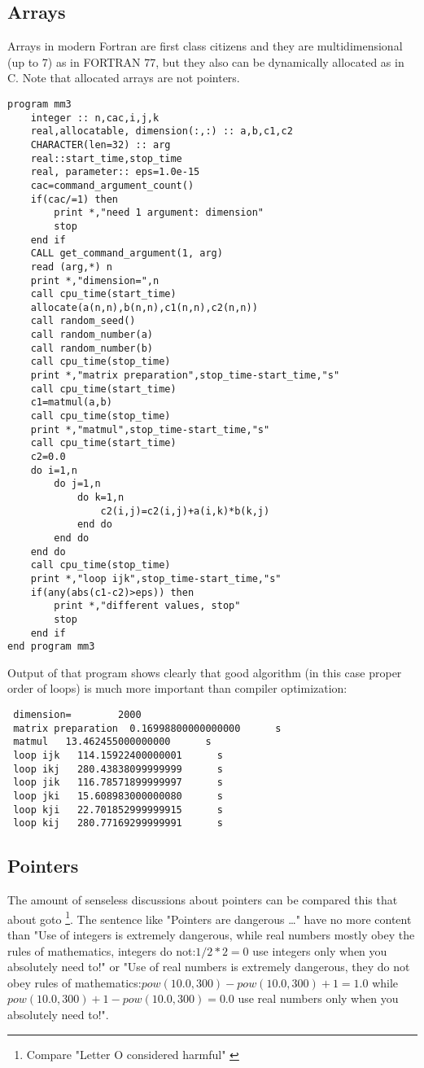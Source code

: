 \documentclass[a4paper]{article}
\begin{document}
\subsection{Arrays}
Arrays in modern Fortran are first class citizens and they are multidimensional (up to 7) as in FORTRAN 77, but
they also can be dynamically allocated as in C. Note that allocated arrays are not pointers.
\begin{verbatim}
program mm3
    integer :: n,cac,i,j,k
    real,allocatable, dimension(:,:) :: a,b,c1,c2
    CHARACTER(len=32) :: arg
    real::start_time,stop_time
    real, parameter:: eps=1.0e-15
    cac=command_argument_count()
    if(cac/=1) then
        print *,"need 1 argument: dimension"
        stop
    end if    
    CALL get_command_argument(1, arg)
    read (arg,*) n
    print *,"dimension=",n
    call cpu_time(start_time)
    allocate(a(n,n),b(n,n),c1(n,n),c2(n,n))
    call random_seed()
    call random_number(a)
    call random_number(b)  
    call cpu_time(stop_time)
    print *,"matrix preparation",stop_time-start_time,"s"
    call cpu_time(start_time)
    c1=matmul(a,b)
    call cpu_time(stop_time)
    print *,"matmul",stop_time-start_time,"s"
    call cpu_time(start_time)
    c2=0.0
    do i=1,n
        do j=1,n
            do k=1,n
                c2(i,j)=c2(i,j)+a(i,k)*b(k,j)
            end do
        end do
    end do
    call cpu_time(stop_time)
    print *,"loop ijk",stop_time-start_time,"s"
    if(any(abs(c1-c2)>eps)) then
        print *,"different values, stop"
        stop
    end if
end program mm3
\end{verbatim}
Output of that program shows clearly that good algorithm (in this case proper order of loops)
is much more important than compiler optimization:
\begin{verbatim}
 dimension=        2000
 matrix preparation  0.16998800000000000      s
 matmul   13.462455000000000      s
 loop ijk   114.15922400000001      s
 loop ikj   280.43838099999999      s
 loop jik   116.78571899999997      s
 loop jki   15.608983000000080      s
 loop kji   22.701852999999915      s
 loop kij   280.77169299999991      s
\end{verbatim}
\subsection{Pointers}
The amount of senseless discussions about pointers can be compared this that about goto \footnote{Compare 
"Letter O considered harmful" \cite {wiki-fortran}}.
The sentence like "Pointers are dangerous \ldots " have no more content than "Use of integers is extremely dangerous, while real numbers mostly obey the rules of mathematics, integers do not:$1/2*2 =0$ use integers only when you absolutely need to!" or "Use of real numbers is extremely dangerous, they do not obey rules of mathematics:$pow(10.0,300)-pow(10.0,300)+1=1.0$ while $pow(10.0,300)+1-pow(10.0,300)=0.0$ use real numbers only when you absolutely need to!".
\end{document}
